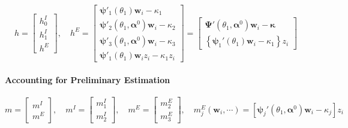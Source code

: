 \[
  h  = \left[
  \begin{array}{c}
    h^I_0 \\ h^I_1 \\ h^E
  \end{array}
\right], \quad
  h^E  =  \left[
 \begin{array}{l}
   \boldsymbol{\psi}'_1(\theta_1)\mathbf{w}_i - \kappa_1\\
   \boldsymbol{\psi}'_2(\theta_1,\boldsymbol{\alpha}^0)\mathbf{w}_i - \kappa_2\\
   \boldsymbol{\psi}'_3(\theta_1,\boldsymbol{\alpha}^0)\mathbf{w}_i - \kappa_3\\ 
   \boldsymbol{\psi}'_1(\theta_1)\mathbf{w}_i z_i - \kappa_1 z_i
 \end{array}
 \right] = \left[
 \begin{array}{l}
   \boldsymbol{\Psi}'(\theta_1, \boldsymbol{\alpha}^0) \mathbf{w}_i - \boldsymbol{\kappa}\\
   \left\{\boldsymbol{\psi}_1'(\theta_1)\mathbf{w}_i - \kappa_1\right\}z_i
 \end{array}
 \right]
\]


\paragraph{Accounting for Preliminary Estimation}
\[
m = \left[
\begin{array}{c}
  m^I \\ m^E
\end{array}
\right], \quad
m^I = \left[
\begin{array}{c}
  m^I_1 \\ m^I_2
\end{array}
\right], \quad
m^E = \left[
  \begin{array}{cc}
    m_2^E \\ m_3^E 
  \end{array}
\right], \quad m_j^E(\mathbf{w}_i, \cdots) = \left[ \boldsymbol{\psi}_j'(\theta_1, \boldsymbol{\alpha}^0) \mathbf{w}_i - \kappa_j \right]z_i 
\]

